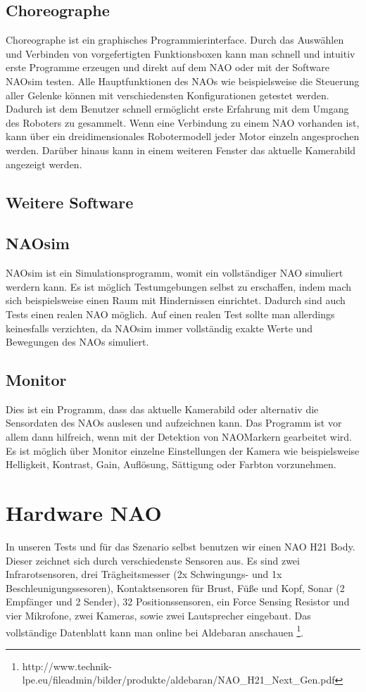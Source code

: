 \subsection{Choreographe}
Choreographe ist ein graphisches Programmierinterface. Durch das Auswählen und Verbinden von vorgefertigten Funktionsboxen kann man schnell und intuitiv erste Programme erzeugen und direkt auf dem NAO oder mit der Software NAOsim testen.
Alle Hauptfunktionen des NAOs wie beispielsweise die Steuerung aller Gelenke können mit verschiedensten Konfigurationen getestet werden. Dadurch ist dem Benutzer schnell ermöglicht erste Erfahrung mit dem Umgang des Roboters zu gesammelt. Wenn eine Verbindung zu einem NAO vorhanden ist, kann über ein dreidimensionales Robotermodell jeder Motor einzeln angesprochen werden. Darüber hinaus kann in einem weiteren Fenster das aktuelle Kamerabild angezeigt werden.
\subsection{Weitere Software}
\subsection*{NAOsim}
NAOsim ist ein Simulationsprogramm, womit ein vollständiger NAO simuliert werdern kann. Es ist möglich Testumgebungen selbst zu erschaffen, indem mach sich beispielsweise einen Raum mit Hindernissen einrichtet. Dadurch sind auch Tests einen realen NAO möglich. Auf einen realen Test sollte man allerdings keinesfalls verzichten, da NAOsim immer vollständig exakte Werte und Bewegungen des NAOs simuliert.
\subsection*{Monitor}
Dies ist ein Programm, dass das aktuelle Kamerabild oder alternativ die Sensordaten des NAOs auslesen und aufzeichnen kann. Das Programm ist vor allem dann hilfreich, wenn mit der Detektion von NAOMarkern gearbeitet wird. Es ist möglich über Monitor einzelne Einstellungen der Kamera wie beispielsweise Helligkeit, Kontrast, Gain, Auflösung, Sättigung oder Farbton vorzunehmen. 

\section{Hardware NAO}
In unseren Tests und für das Szenario selbst benutzen wir einen NAO H21 Body. Dieser zeichnet sich durch verschiedenste Sensoren aus. Es sind zwei Infrarotsensoren, drei Trägheitsmesser (2x Schwingungs- und 1x Beschleunigungssesoren), Kontaktsensoren für Brust, Füße und Kopf, Sonar (2 Empfänger und 2 Sender), 32 Positionssensoren, ein Force Sensing Resistor und vier Mikrofone, zwei Kameras, sowie zwei Lautsprecher eingebaut. Das vollständige Datenblatt kann man online bei Aldebaran anschauen%
	\footnote{http://www.technik-lpe.eu/fileadmin/bilder/produkte/aldebaran/NAO\_H21\_Next\_Gen.pdf}.

